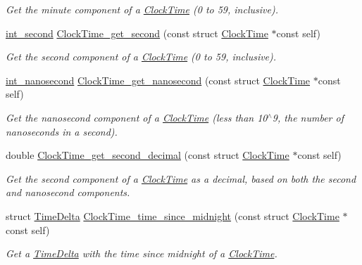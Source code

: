 \begin{DoxyCompactItemize}
\begin{DoxyCompactList}\small\item\em \-Get the minute component of a \hyperlink{structClockTime}{\-Clock\-Time} (0 to 59, inclusive). \end{DoxyCompactList}\item 
\hyperlink{types_8h_acdee90940aea1c6f3e71652fb525a987}{int\-\_\-second} \hyperlink{clock-time_8h_a77c448c2991009dbcb662696a7ceedca}{\-Clock\-Time\-\_\-get\-\_\-second} (const struct \hyperlink{structClockTime}{\-Clock\-Time} $\ast$const self)
\begin{DoxyCompactList}\small\item\em \-Get the second component of a \hyperlink{structClockTime}{\-Clock\-Time} (0 to 59, inclusive). \end{DoxyCompactList}\item 
\hyperlink{types_8h_a2a3f766e7346eb6ae01022cd28128ea6}{int\-\_\-nanosecond} \hyperlink{clock-time_8h_ad74a9b1b36f0fd4b4a739b69fb65869e}{\-Clock\-Time\-\_\-get\-\_\-nanosecond} (const struct \hyperlink{structClockTime}{\-Clock\-Time} $\ast$const self)
\begin{DoxyCompactList}\small\item\em \-Get the nanosecond component of a \hyperlink{structClockTime}{\-Clock\-Time} (less than 10$^\wedge$9, the number of nanoseconds in a second). \end{DoxyCompactList}\item 
double \hyperlink{clock-time_8h_a7cf42452da58eb906b00e92fe3efb159}{\-Clock\-Time\-\_\-get\-\_\-second\-\_\-decimal} (const struct \hyperlink{structClockTime}{\-Clock\-Time} $\ast$const self)
\begin{DoxyCompactList}\small\item\em \-Get the second component of a \hyperlink{structClockTime}{\-Clock\-Time} as a decimal, based on both the second and nanosecond components. \end{DoxyCompactList}\item 
struct \hyperlink{structTimeDelta}{\-Time\-Delta} \hyperlink{clock-time_8h_ace4db26641fe01b2edd311b09589ebbb}{\-Clock\-Time\-\_\-time\-\_\-since\-\_\-midnight} (const struct \hyperlink{structClockTime}{\-Clock\-Time} $\ast$const self)
\begin{DoxyCompactList}\small\item\em \-Get a \hyperlink{structTimeDelta}{\-Time\-Delta} with the time since midnight of a \hyperlink{structClockTime}{\-Clock\-Time}. \end{DoxyCompactList}\item 

\end{DoxyCompactItemize}
